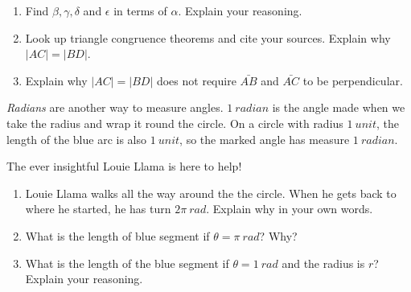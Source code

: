 \documentclass[noauthor,nooutcomes,handout]{ximera}
\begin{document}
\mynewpage



\begin{question}
\begin{enumerate}
    \item Find $\beta,\gamma,\delta$ and $\epsilon$ in terms of $\alpha$. Explain your reasoning. 
    \item Look up triangle congruence theorems and cite your sources. Explain why $\left\vert AC\right\vert =\left\vert
BD\right\vert $.
    \item Explain why $\left\vert AC\right\vert =\left\vert
BD\right\vert $ does not require $\bar{AB}$ and $\bar{AC}$ to be perpendicular.
\end{enumerate}
\end{question}
\mynewpage




\begin{question}
\textit{Radians} are another way to measure angles. $1 \ radian$ is the angle made when we take the radius
and wrap it round the circle. On a circle with radius $1\ unit$, the length of the blue arc is also $1\ unit$, so the marked angle has measure $1 \ radian$.


\begin{center}
 
\end{center}

The ever insightful Louie Llama is here to help!

\begin{enumerate}
    \item Louie Llama walks all the way around the  the circle. When he gets back to where he started, he has turn $2\pi \ rad$. Explain why in your own words. 
    \item What is the length of blue segment if $\theta=\pi \ rad$? Why?
    \item What is the length of the blue segment if $\theta=1 \ rad$ and the radius is $r$? Explain your reasoning.
\end{enumerate}
\end{question}
\mynewpage
\end{document}
